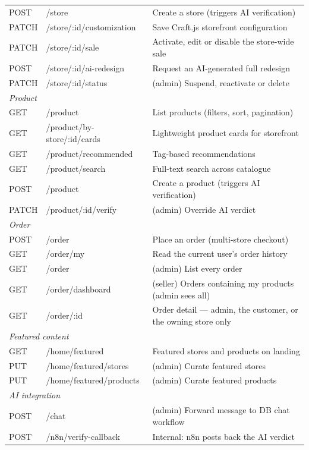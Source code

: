 \documentclass[12pt, a4paper, oneside]{report}
\begin{document}
\begin{table}[H]
\begin{tabularx}{\textwidth}{llX}
    POST  & /store                       & Create a store (triggers AI verification) \\
    PATCH & /store/:id/customization     & Save Craft.js storefront configuration \\
    PATCH & /store/:id/sale              & Activate, edit or disable the store-wide sale \\
    POST  & /store/:id/ai-redesign       & Request an AI-generated full redesign \\
    PATCH & /store/:id/status            & (admin) Suspend, reactivate or delete \\
    \midrule
    \multicolumn{3}{l}{\textit{Product}} \\
    GET   & /product                     & List products (filters, sort, pagination) \\
    GET   & /product/by-store/:id/cards  & Lightweight product cards for storefront \\
    GET   & /product/recommended         & Tag-based recommendations \\
    GET   & /product/search              & Full-text search across catalogue \\
    POST  & /product                     & Create a product (triggers AI verification) \\
    PATCH & /product/:id/verify          & (admin) Override AI verdict \\
    \midrule
    \multicolumn{3}{l}{\textit{Order}} \\
    POST  & /order                       & Place an order (multi-store checkout) \\
    GET   & /order/my                    & Read the current user's order history \\
    GET   & /order                       & (admin) List every order \\
    GET   & /order/dashboard             & (seller) Orders containing my products (admin sees all) \\
    GET   & /order/:id                   & Order detail — admin, the customer, or the owning store only \\
    \midrule
    \multicolumn{3}{l}{\textit{Featured content}} \\
    GET   & /home/featured               & Featured stores and products on landing \\
    PUT   & /home/featured/stores        & (admin) Curate featured stores \\
    PUT   & /home/featured/products      & (admin) Curate featured products \\
    \midrule
    \multicolumn{3}{l}{\textit{AI integration}} \\
    POST  & /chat                        & (admin) Forward message to DB chat workflow \\
    POST  & /n8n/verify-callback         & Internal: n8n posts back the AI verdict \\
    \bottomrule
  \end{tabularx}
  \label{tab:api}
\end{table}
\end{document}
